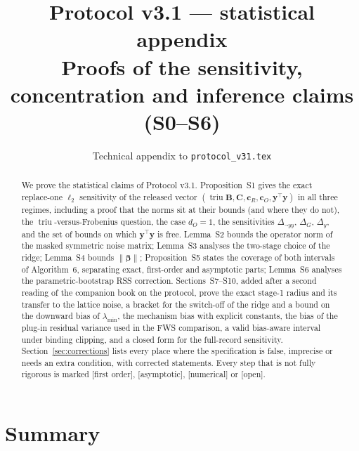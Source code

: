 \documentclass[11pt]{article}
\title{\textbf{Protocol v3.1 --- statistical appendix}\\[4pt]
\large Proofs of the sensitivity, concentration and inference claims (S0--S6)}
\date{Technical appendix to \texttt{protocol\_v31.tex}}
\theoremstyle{definition}
\theoremstyle{plain}
\newcommand{\bB}{\mathbf{B}}
\newcommand{\bC}{\mathbf{C}}
\newcommand{\bc}{\mathbf{c}}
\newcommand{\by}{\mathbf{y}}
\newcommand{\bbeta}{\boldsymbol{\beta}}
\DeclareMathOperator{\triu}{triu}
\newcommand{\lmin}{\lambda_{\min}}
\newcommand{\status}[1]{\textsf{\small[#1]}}
\begin{document}
\maketitle

\begin{abstract}
\noindent
We prove the statistical claims of Protocol v3.1. Proposition~S1 gives the exact replace-one $\ell_2$ sensitivity of the released vector $(\triu\bB,\bC,\bc_R,\bc_O,\by^\top\by)$ in all three regimes, including a proof that the norms sit at their bounds (and where they do not), the $\triu$-versus-Frobenius question, the case $d_O=1$, the sensitivities $\Delta_{\neg yy}$, $\Delta_G$, $\Delta_y$, and the set of bounds on which $\by^\top\by$ is free. Lemma~S2 bounds the operator norm of the masked symmetric noise matrix; Lemma~S3 analyses the two-stage choice of the ridge; Lemma~S4 bounds $\|\bbeta\|$; Proposition~S5 states the coverage of both intervals of Algorithm~6, separating exact, first-order and asymptotic parts; Lemma~S6 analyses the parametric-bootstrap RSS correction. Sections~S7--S10, added after a second reading of the companion book on the protocol, prove the exact stage-1 radius and its transfer to the lattice noise, a bracket for the switch-off of the ridge and a bound on the downward bias of $\lmin$, the mechanism bias with explicit constants, the bias of the plug-in residual variance used in the FWS comparison, a valid bias-aware interval under binding clipping, and a closed form for the full-record sensitivity. Section~\ref{sec:corrections} lists every place where the specification is false, imprecise or needs an extra condition, with corrected statements. Every step that is not fully rigorous is marked \status{first order}, \status{asymptotic}, \status{numerical} or \status{open}.
\end{abstract}

\tableofcontents

\section{Summary}
\label{sec:summary}
\end{document}
